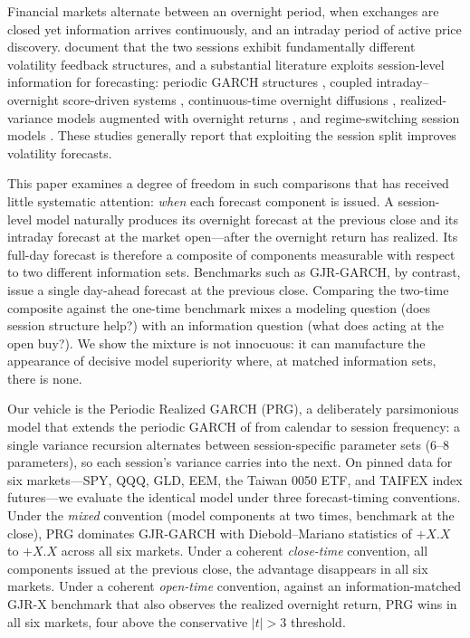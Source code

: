 \documentclass[11pt,a4paper]{article}
\begin{document}
Financial markets alternate between an overnight period, when exchanges are closed yet information arrives continuously, and an intraday period of active price discovery. \citet{Blanc2014} document that the two sessions exhibit fundamentally different volatility feedback structures, and a substantial literature exploits session-level information for forecasting: periodic GARCH structures \citep{Bollerslev1996}, coupled intraday--overnight score-driven systems \citep{Linton2020}, continuous-time overnight diffusions \citep{Kim2023}, realized-variance models augmented with overnight returns \citep{Todorova2014,Opschoor2021}, and regime-switching session models \citep{Lai2024}. These studies generally report that exploiting the session split improves volatility forecasts.

This paper examines a degree of freedom in such comparisons that has received little systematic attention: \emph{when} each forecast component is issued. A session-level model naturally produces its overnight forecast at the previous close and its intraday forecast at the market open---after the overnight return has realized. Its full-day forecast is therefore a composite of components measurable with respect to two different information sets. Benchmarks such as GJR-GARCH, by contrast, issue a single day-ahead forecast at the previous close. Comparing the two-time composite against the one-time benchmark mixes a modeling question (does session structure help?) with an information question (what does acting at the open buy?). We show the mixture is not innocuous: it can manufacture the appearance of decisive model superiority where, at matched information sets, there is none.

Our vehicle is the Periodic Realized GARCH (PRG), a deliberately parsimonious model that extends the periodic GARCH of \citet{Bollerslev1996} from calendar to session frequency: a single variance recursion alternates between session-specific parameter sets (6--8 parameters), so each session's variance carries into the next. On pinned data for six markets---SPY, QQQ, GLD, EEM, the Taiwan 0050 ETF, and TAIFEX index futures---we evaluate the identical model under three forecast-timing conventions. Under the \emph{mixed} convention (model components at two times, benchmark at the close), PRG dominates GJR-GARCH with Diebold--Mariano statistics of
$+X.X$ to $+X.X$
across all six markets. Under a coherent \emph{close-time} convention, all components issued at the previous close, the advantage disappears in all six markets. Under a coherent \emph{open-time} convention, against an information-matched GJR-X benchmark that also observes the realized overnight return, PRG wins in all six markets, four above the conservative $|t|>3$ threshold.
\end{document}
